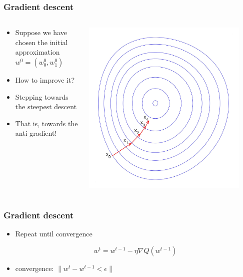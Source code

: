 \documentclass[default]{beamer}
\begin{document}
	\begin{frame}
		\frametitle{Gradient descent}
		
		\begin{columns}
			\begin{column}{0.6\textwidth}
				\begin{itemize}
					\item Suppose we have chosen the initial approximation $w^0=(w_0^0,w_1^0)$
					\item How to improve it?
					\item Stepping towards the steepest descent
					\item That is, towards the anti-gradient!
				\end{itemize}
			\end{column}
			\begin{column}{0.6\textwidth}
				\centering
				\includegraphics[width=0.9\textwidth]{linear_21.jpg}
			\end{column}
			
		\end{columns}
		
	\end{frame}


	\begin{frame}
		\frametitle{Gradient descent}
		
		\Large
		\begin{itemize}
			\item Repeat until convergence
			
			\[
			w^t=w^{t-1}-\eta \nabla Q(w^{t-1})
			\]
			
			\item convergence: $\|w^t-w^{t-1}<\epsilon\|$
		\end{itemize}
		
	\end{frame}
		
\end{document}
